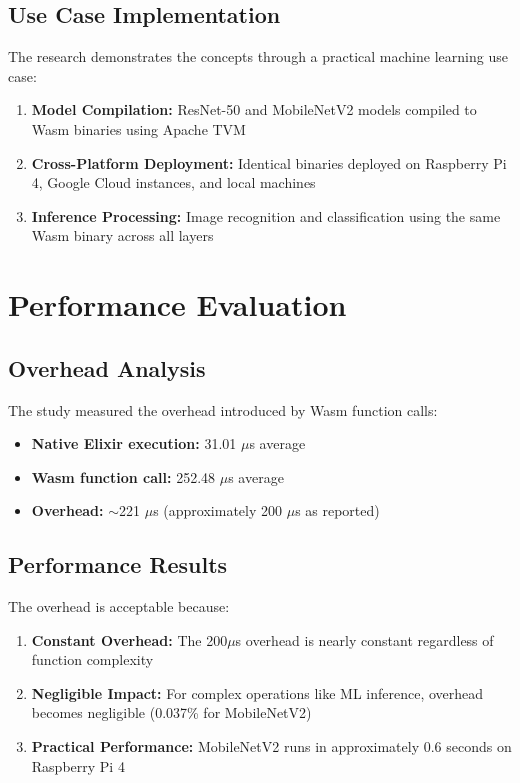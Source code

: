 \documentclass[11pt]{article}
\begin{document}
\subsection{Use Case Implementation}

The research demonstrates the concepts through a practical machine learning use case:

\begin{enumerate}[label=\arabic*.]
\item \textbf{Model Compilation:} ResNet-50 and MobileNetV2 models compiled to Wasm binaries using Apache TVM
\item \textbf{Cross-Platform Deployment:} Identical binaries deployed on Raspberry Pi 4, Google Cloud instances, and local machines
\item \textbf{Inference Processing:} Image recognition and classification using the same Wasm binary across all layers
\end{enumerate}

\section{Performance Evaluation}

\subsection{Overhead Analysis}

The study measured the overhead introduced by Wasm function calls:

\begin{itemize}
\item \textbf{Native Elixir execution:} 31.01 $\mu$s average
\item \textbf{Wasm function call:} 252.48 $\mu$s average
\item \textbf{Overhead:} $\sim$221 $\mu$s (approximately 200 $\mu$s as reported)
\end{itemize}

\subsection{Performance Results}

The overhead is acceptable because:

\begin{enumerate}[label=\arabic*.]
\item \textbf{Constant Overhead:} The 200$\mu$s overhead is nearly constant regardless of function complexity
\item \textbf{Negligible Impact:} For complex operations like ML inference, overhead becomes negligible (0.037\% for MobileNetV2)
\item \textbf{Practical Performance:} MobileNetV2 runs in approximately 0.6 seconds on Raspberry Pi 4
\end{enumerate}
\end{document}
